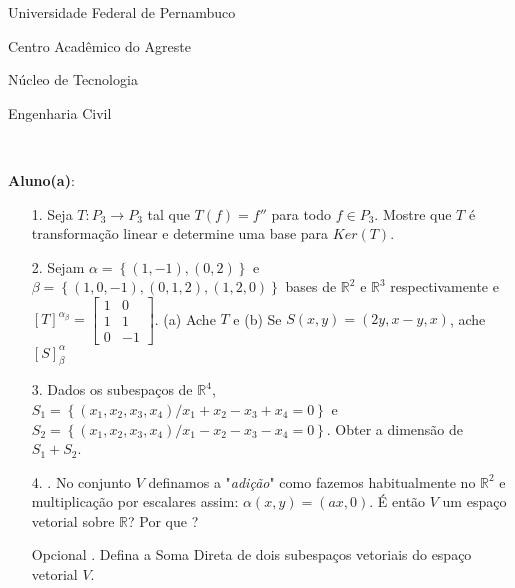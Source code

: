 \documentclass[oneside,a4paper,12pt]{article}
\newcommand{\universidade}{Universidade Federal de Pernambuco}
\newcommand{\centro}{Centro Acadêmico do Agreste}
\newcommand{\departamento}{Núcleo de Tecnologia}
\newcommand{\curso}{Engenharia Civil}
\begin{document}
  \vspace{12pt}
  
     \begin{center}
     	\vspace{0pt}
     	
     	\universidade
     	\par
     	\centro
     	\par
     	\departamento
     	\par
     	\curso
     	\par
     	\vspace{08pt}
     	\\
     \end{center}
     
     \begin{flushleft}
     	\textbf{Aluno(a)}:
     \end{flushleft}
 
 \begin{itemize}
 	\item[1.]  Seja $T:P_{3}\longrightarrow P_{3} $ tal que $T(f)=f''$ para todo $f\in P_{3}$. Mostre que $T$ é transformação linear e determine uma base para $Ker(T)$.
 \end{itemize}
 \begin{itemize}
 	\item[2.] Sejam $\alpha=\left\lbrace (1,-1),(0,2) \right\rbrace $ e $\beta=\left\lbrace (1,0,-1),(0,1,2), (1,2,0)\right\rbrace $ bases de $\mathbb{R}^{2} $ e $\mathbb{R}^{3}$ respectivamente e\\ $[T]^{\alpha_{\beta}}=\begin{bmatrix}
 	1       & 0 \\
 	1       & 1 \\
 	0       & -1
 	\end{bmatrix}$. (a) Ache $T$ e (b) Se $S(x,y)=(2y,x-y,x)$, ache $[S]^{\alpha}_{\beta}$
 \end{itemize}
 \begin{itemize}
 	\item [3.] Dados os subespaços de $\mathbb{R}^{4}$, $S_{1}=\left\lbrace (x_{1},x_{2},x_{3},x_{4}) / x_{1}+x_{2}-x_{3}+x_{4}=0 \right\rbrace $ e\\ $S_{2}=\left\lbrace (x_{1},x_{2},x_{3},x_{4}) / x_{1}-x_{2}-x_{3}-x_{4}=0 \right\rbrace $. Obter a dimensão de $S_{1}+S_{2}$.
 \end{itemize}
 \begin{itemize}
 	\item[4.]. No conjunto $V$ definamos a "\textit{adição}" como fazemos habitualmente no $ \mathbb{R}^{2}$ e multiplicação por escalares assim: $\alpha (x,y)=(ax,0)$. É então $V$ um espaço vetorial sobre $ \mathbb{R}$? Por que ?
\end{itemize}
\begin{itemize}
	\item[Opcional]. Defina a Soma Direta de dois subespaços vetoriais do espaço vetorial $V$.
	
\end{itemize}	
\flushbottom
\flushright
\end{document}
